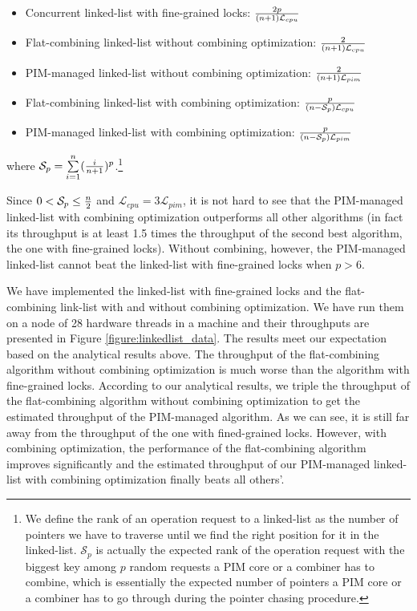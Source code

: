 \documentclass[11pt]{article}
\newcommand{\latpim} {\mathcal{L}_{pim}}
\newcommand{\latcpu} {\mathcal{L}_{cpu}}
\newcommand{\Sp}{\mathcal{S}_{p}}
\begin{document}
\begin{itemize}
\item Concurrent linked-list with fine-grained locks:
	${2p \over (n+1)\latcpu}$

\item Flat-combining linked-list without combining optimization:
	${2 \over (n+1)\latcpu}$

\item PIM-managed linked-list without combining optimization:
	${2 \over (n+1)\latpim}$

\item Flat-combining linked-list with combining optimization:
    ${p \over (n-\Sp)\latcpu}$

\item PIM-managed linked-list with combining optimization:
    ${p \over (n-\Sp)\latpim}$
\end{itemize}

where $\Sp = \sum\limits_{i=1}^{n} ({i \over n+1})^{p}$.\footnote {
We define the rank of an operation request to a linked-list as the number of pointers
we have to traverse until we find the right position for it in the linked-list.
$\Sp$ is actually the expected rank of the operation request with the biggest key
among $p$ random requests a PIM core or a combiner has to combine,
which is essentially the expected number of pointers a PIM core or a combiner
has to go through during the pointer chasing procedure.}

Since $0 < \Sp \le {n \over 2}$ and $\latcpu = 3\latpim$,
it is not hard to see that the PIM-managed linked-list with
combining optimization outperforms all other algorithms
(in fact its throughput is at least 1.5 times the throughput of
the second best algorithm, the one with fine-grained locks).
Without combining, however, the PIM-managed linked-list cannot
beat the linked-list with fine-grained locks when $p > 6$.

We have implemented the linked-list with fine-grained locks
and the flat-combining link-list with and without combining optimization.
We have run them on a node of 28 hardware threads in a machine
and their throughputs are presented in Figure \ref{figure:linkedlist_data}.
The results meet our expectation based on the analytical results above.
The throughput of the flat-combining algorithm without combining optimization
is much worse than the algorithm with fine-grained locks.
According to our analytical results, we triple the throughput of the
flat-combining algorithm without combining optimization to get the estimated
throughput of the PIM-managed algorithm. As we can see,
it is still far away from the throughput of the one with fined-grained locks.
However, with combining optimization, the performance of the flat-combining
algorithm improves significantly and the estimated throughput of our PIM-managed
linked-list with combining optimization finally beats all others'.
\end{document}

